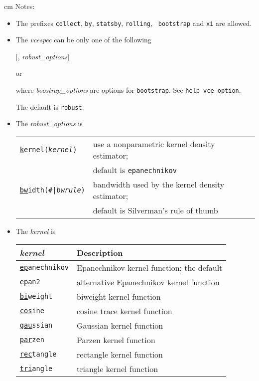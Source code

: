  cm
Notes:
\begin{itemize}

  \item The prefixes {\tt collect}, {\tt by}, {\tt statsby}, {\tt rolling}, {\tt
    bootstrap} and {\tt xi} are allowed.

\item The {\it vcespec} can be only one of the following
  	
 [, {\it robust\_options}]

\qquad 	or 


where {\it boostrap\_options} are options for {\tt bootstrap}. See {\tt help
vce\_option}.

The default is {\tt robust}.

\item The {\it robust\_options} is 

\begin{tabular}{ll} 
\hline
{\tt \underline{k}ernel({\it kernel})} & use a nonparametric kernel
density estimator; \\
& default is {\tt epanechnikov} \\
{\tt \underline{bw}idth(\#|{\it bwrule})} & bandwidth used by the kernel
density estimator;\\ & default is Silverman's rule of thumb\\
\hline
\end{tabular}

\item The {\it kernel} is

\begin{tabular}{ll}
\hline
{\it kernel} & Description \\
\hline
{\tt \underline{ep}anechnikov}& Epanechnikov kernel function; the default \\
{\tt epan2       	     }   & alternative Epanechnikov kernel function \\
{\tt \underline{bi}weight    }& biweight kernel function \\
{\tt \underline{cos}ine      }& cosine trace kernel function \\
{\tt \underline{gau}ssian    }& Gaussian kernel function \\
{\tt \underline{par}zen      }& Parzen kernel function \\
{\tt \underline{rec}tangle   }& rectangle kernel function \\
{\tt \underline{tri}angle    }& triangle kernel function \\
\hline
\end{tabular}


\end{itemize}
